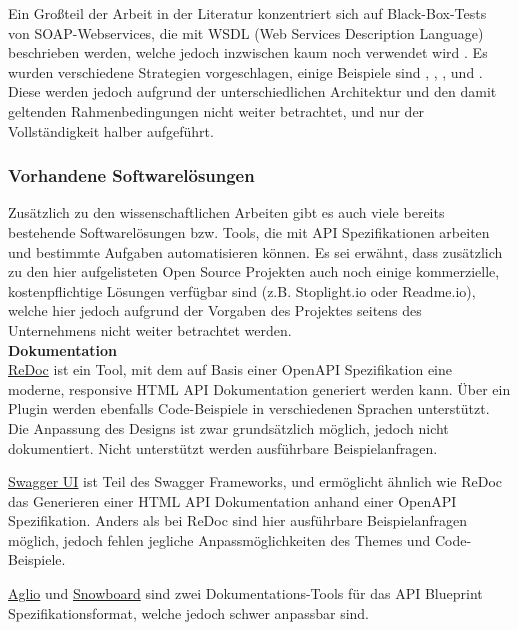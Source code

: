 Ein Großteil der Arbeit in der Literatur konzentriert sich auf Black-Box-Tests von SOAP-Webservices, die mit WSDL (Web Services Description Language) beschrieben werden, welche jedoch inzwischen kaum noch verwendet wird \parencite[37--39]{scherer2016description}. Es wurden verschiedene Strategien vorgeschlagen, einige Beispiele sind \textcite{xu2005testing}, \textcite{bai2005wsdl}, \textcite{martin2006automated}, \textcite{ma2008wsdl} und \textcite{bartolini2009ws}. Diese werden jedoch aufgrund der unterschiedlichen Architektur und den damit geltenden Rahmenbedingungen nicht weiter betrachtet, und nur der Vollständigkeit halber aufgeführt.


\subsubsection{Vorhandene Softwarelösungen}

Zusätzlich zu den wissenschaftlichen Arbeiten gibt es auch viele bereits bestehende Softwarelösungen bzw. Tools, die mit API Spezifikationen arbeiten und bestimmte Aufgaben automatisieren können. Es sei erwähnt, dass zusätzlich zu den hier aufgelisteten Open Source Projekten auch noch einige kommerzielle, kostenpflichtige Lösungen verfügbar sind (z.B. Stoplight.io oder Readme.io), welche hier jedoch aufgrund der Vorgaben des Projektes seitens des Unternehmens nicht weiter betrachtet werden.\\

\textbf{Dokumentation}\\
\href{https://github.com/Rebilly/ReDoc}{ReDoc} ist ein Tool, mit dem auf Basis einer OpenAPI Spezifikation eine moderne, responsive HTML API Dokumentation generiert werden kann. Über ein Plugin werden ebenfalls Code-Beispiele in verschiedenen Sprachen unterstützt. Die Anpassung des Designs ist zwar grundsätzlich möglich, jedoch nicht dokumentiert. Nicht unterstützt werden ausführbare Beispielanfragen.

\href{https://swagger.io/tools/swagger-ui/}{Swagger UI} ist Teil des Swagger Frameworks, und ermöglicht ähnlich wie ReDoc das Generieren einer HTML API Dokumentation anhand einer OpenAPI Spezifikation. Anders als bei ReDoc sind hier ausführbare Beispielanfragen möglich, jedoch fehlen jegliche Anpassmöglichkeiten des Themes und Code-Beispiele.

\href{https://github.com/danielgtaylor/aglio}{Aglio} und \href{https://github.com/subosito/snowboard}{Snowboard} sind zwei Dokumentations-Tools für das API Blueprint Spezifikationsformat, welche jedoch schwer anpassbar sind.

